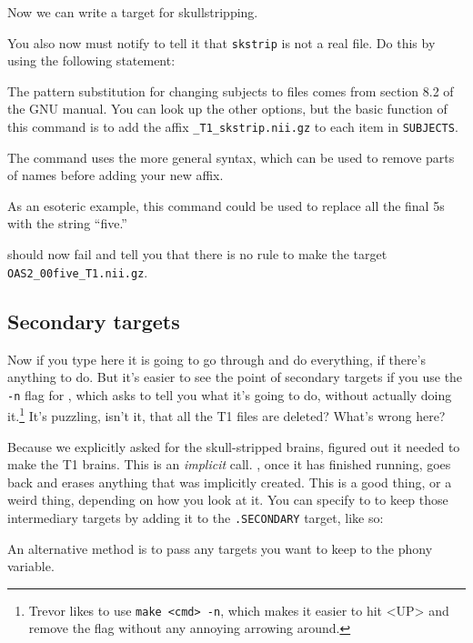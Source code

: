 Now we can write a target for skullstripping.

You also now must notify \maken{} to tell it that \texttt{skstrip} is not a real  file. Do this by using the following statement:

The pattern substitution for changing subjects to files comes from section 8.2 of the GNU \maken{} manual. You can look up the other options, but the basic function of this command is to add the affix \texttt{_T1_skstrip.nii.gz} to each item in \texttt{SUBJECTS}. 

The command uses the more general syntax, which can be used to remove parts of names before adding your new affix.

As an esoteric example, this command could be used to replace all the final 5s with the string ``five.''

\maken{} should now fail and tell you that there is no rule to make the target \texttt{OAS2_00five_T1.nii.gz}.

\subsection{Secondary targets}

Now if you type \maken{} here it is going to go through and do everything, if there's anything to do. But it's easier to see the point of secondary targets if you use the \texttt{-n} flag for \maken{}, which asks \maken{} to tell you what it's going to do, without actually doing it.\footnote{Trevor likes to use \texttt{make <cmd> -n}, which makes it easier to hit <UP> and remove the flag without any annoying arrowing around.} It's puzzling, isn't it, that all the T1 files are deleted? What's wrong here?

Because we explicitly asked for the skull-stripped brains, \maken{} figured out it needed to make the T1 brains. This is an \emph{implicit} call. \maken, once it has finished running, goes back and erases anything that was implicitly created. This is a good thing, or a weird thing, depending on how you look at it. You can specify to \maken{} to keep those intermediary targets by adding it to the \texttt{.SECONDARY} target, like so:

An alternative method is to pass any targets you want to keep to the phony variable.

